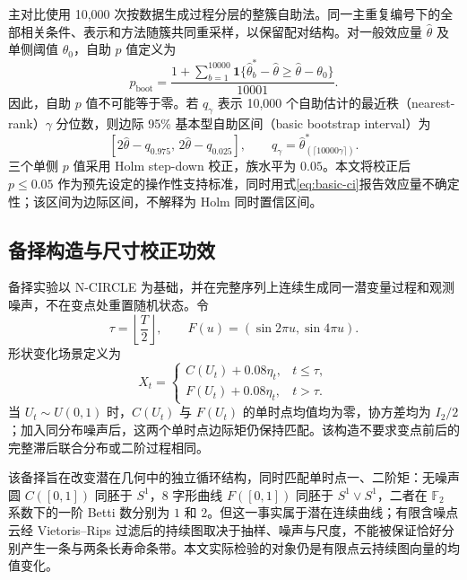 主对比使用 10,000 次按数据生成过程分层的整簇自助法。同一主重复编号下的全部相关条件、表示和方法随簇共同重采样，以保留配对结构。对一般效应量 $\widehat\theta$ 及单侧阈值 $\theta_0$，自助 $p$ 值定义为
\begin{equation}\label{eq:bootstrap-p}
 p_{\mathrm{boot}}
 =\frac{1+\sum_{b=1}^{10000}
 \mathbf1\{\widehat\theta_b^*-\widehat\theta
 \ge \widehat\theta-\theta_0\}}
 {10001}.
\end{equation}
因此，自助 $p$ 值不可能等于零。若 $q_\gamma$ 表示 10,000 个自助估计的最近秩（nearest-rank）$\gamma$ 分位数，则边际 95\% 基本型自助区间（basic bootstrap interval）\cite{DavisonHinkley1997}为
\begin{equation}\label{eq:basic-ci}
 \left[2\widehat\theta-q_{0.975},\,
       2\widehat\theta-q_{0.025}\right],
 \qquad
 q_\gamma=\widehat\theta^*_{(\lceil10000\gamma\rceil)}.
\end{equation}
三个单侧 $p$ 值采用 Holm step-down 校正\cite{Holm1979}，族水平为 $0.05$。本文将校正后 $p\le0.05$ 作为预先设定的操作性支持标准，同时用式\eqref{eq:basic-ci}报告效应量不确定性；该区间为边际区间，不解释为 Holm 同时置信区间。

\subsection{备择构造与尺寸校正功效}\label{sec:alternatives}

备择实验以 N-CIRCLE 为基础，并在完整序列上连续生成同一潜变量过程和观测噪声，不在变点处重置随机状态。令
\[
 \tau=\left\lfloor\frac T2\right\rfloor,
 \qquad
 F(u)=(\sin2\pi u,\sin4\pi u).
\]
形状变化场景定义为
\begin{equation}\label{eq:shape-alt}
 X_t=
 \begin{cases}
 C(U_t)+0.08\eta_t, & t\le\tau,\\
 F(U_t)+0.08\eta_t, & t>\tau.
 \end{cases}
\end{equation}
当 $U_t\sim U(0,1)$ 时，$C(U_t)$ 与 $F(U_t)$ 的单时点均值均为零，协方差均为 $I_2/2$；加入同分布噪声后，这两个单时点边际矩仍保持匹配。该构造不要求变点前后的完整滞后联合分布或二阶过程相同。

该备择旨在改变潜在几何中的独立循环结构，同时匹配单时点一、二阶矩：无噪声圆 $C([0,1])$ 同胚于 $S^1$，8 字形曲线 $F([0,1])$ 同胚于 $S^1\vee S^1$，二者在 $\mathbb F_2$ 系数下的一阶 Betti 数分别为 $1$ 和 $2$。但这一事实属于潜在连续曲线；有限含噪点云经 Vietoris--Rips 过滤后的持续图取决于抽样、噪声与尺度，不能被保证恰好分别产生一条与两条长寿命条带。本文实际检验的对象仍是有限点云持续图向量的均值变化。

